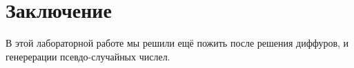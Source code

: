 \section{Заключение}
    В этой лабораторной работе мы решили ещё пожить после решения диффуров, и генерерации псевдо-случайных числел.
